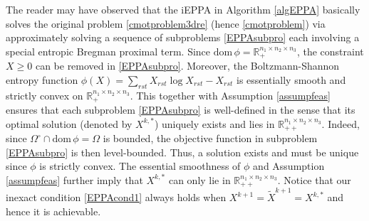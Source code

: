 \documentclass[10pt]{article}
\begin{document}
The reader may have observed that the iEPPA in Algorithm \ref{algEPPA} basically solves the original problem \eqref{cmotproblem3dre} (hence \eqref{cmotproblem}) via approximately solving a sequence of subproblems \eqref{EPPAsubpro} each involving a special entropic Bregman proximal term. Since $\mathrm{dom}\,\phi = \mathbb{R}_{+}^{n_1 \times n_2 \times n_3}$, the constraint $X\geq0$ can be removed in \eqref{EPPAsubpro}. Moreover, the Boltzmann-Shannon entropy function $\phi(X)=\sum_{rst}X_{rst}\log X_{rst} - X_{rst}$ is essentially smooth and strictly convex on $\mathbb{R}_{+}^{n_1 \times n_2 \times n_3}$. This together with Assumption \ref{assumpfeas} ensures that each subproblem \eqref{EPPAsubpro} is well-defined in the sense that its optimal solution (denoted by $X^{k,*}$) uniquely exists and lies in $\mathbb{R}_{++}^{n_1 \times n_2 \times n_3}$. Indeed, since $\Omega^{\circ}\cap\mathrm{dom}\,\phi=\Omega$ is bounded, the objective function in subproblem \eqref{EPPAsubpro} is then level-bounded. Thus, a solution exists \cite[Theorem 1.9]{rw1998variational} and must be unique since $\phi$ is strictly convex. The essential smoothness of $\phi$ and Assumption \ref{assumpfeas} further imply that $X^{k,*}$ can only lie in $\mathbb{R}_{++}^{n_1 \times n_2 \times n_3}$. Notice that our inexact condition \eqref{EPPAcond1} always holds when $X^{k+1}=\widetilde{X}^{k+1}=X^{k,*}$ and hence it is achievable.
\end{document}
